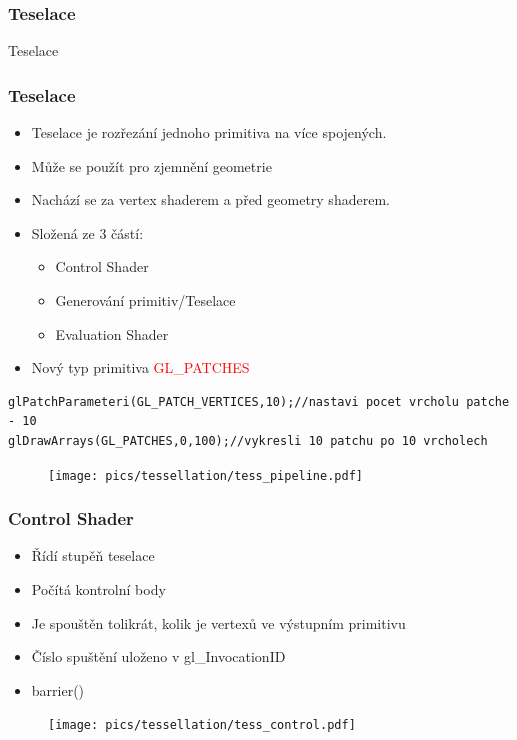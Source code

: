 \begin{frame}
\frametitle{Teselace}
\begin{center}
\Huge {\color{white}Teselace}
\end{center}
\end{frame}

\begin{frame}[fragile]
\frametitle{Teselace}
	\begin{itemize}
	\item Teselace je rozřezání jednoho primitiva na více spojených.
	\item Může se použít pro zjemnění geometrie
	\item Nachází se za vertex shaderem a před geometry shaderem.
	\item Složená ze 3 částí:
	\begin{itemize}
	\item Control Shader
	\item Generování primitiv/Teselace
	\item Evaluation Shader
	\end{itemize}
	\item Nový typ primitiva \textcolor{red}{GL\_PATCHES}
	\end{itemize}
  {\scriptsize
	\begin{verbatim}
glPatchParameteri(GL_PATCH_VERTICES,10);//nastavi pocet vrcholu patche - 10
glDrawArrays(GL_PATCHES,0,100);//vykresli 10 patchu po 10 vrcholech
	\end{verbatim}
  }
	\begin{figure}[h]
	\texttt{[image: pics/tessellation/tess\_pipeline.pdf]}
	\end{figure}
\end{frame}

\begin{frame}
\frametitle{Control Shader}
	\begin{itemize}
	\item Řídí stupěň teselace
	\item Počítá kontrolní body
	\item Je spouštěn tolikrát, kolik je vertexů ve výstupním primitivu
	\item Číslo spuštění uloženo v \textcolor{OliveGreen}{gl\_InvocationID}
	\item \textcolor{OliveGreen}{barrier}()
	\end{itemize}
	\begin{figure}[h]
	\texttt{[image: pics/tessellation/tess\_control.pdf]}
	\end{figure}
\end{frame}

